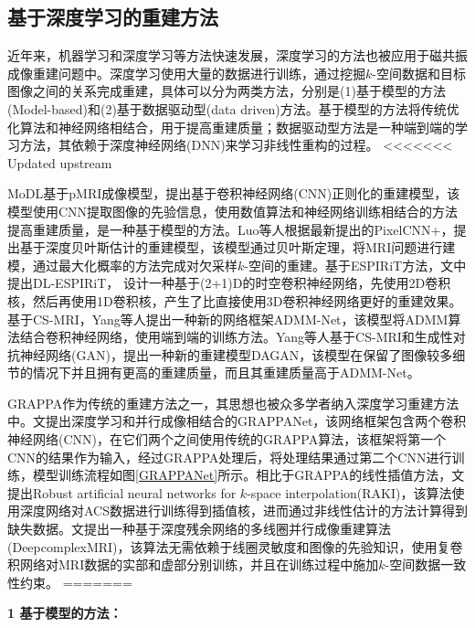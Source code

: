 \documentclass[UTF8]{article}
\begin{document}
\subsection{基于深度学习的重建方法}
\par 近年来，机器学习和深度学习等方法快速发展，深度学习的方法也被应用于磁共振成像重建问题中。深度学习使用大量的数据进行训练，通过挖掘$k$-空间数据和目标图像之间的关系完成重建，具体可以分为两类方法，分别是(1)基于模型的方法(Model-based)和(2)基于数据驱动型(data driven)方法。基于模型的方法将传统优化算法和神经网络相结合，用于提高重建质量；数据驱动型方法是一种端到端的学习方法，其依赖于深度神经网络(DNN)来学习非线性重构的过程。
<<<<<<< Updated upstream

\par MoDL\cite{aggarwal2018modl}基于pMRI成像模型，提出基于卷积神经网络(CNN)正则化的重建模型，该模型使用CNN提取图像的先验信息，使用数值算法和神经网络训练相结合的方法提高重建质量，是一种基于模型的方法。Luo等人根据最新提出的PixelCNN+\cite{salimans2017pixelcnn++}，提出基于深度贝叶斯估计的重建模型\cite{luo2020mri}，该模型通过贝叶斯定理，将MRI问题进行建模，通过最大化概率的方法完成对欠采样$k$-空间的重建。基于ESPIRiT方法，文\cite{sandino2021accelerating}中提出DL-ESPIRiT， 设计一种基于(2+1)D的时空卷积神经网络，先使用2D卷积核，然后再使用1D卷积核，产生了比直接使用3D卷积神经网络更好的重建效果。基于CS-MRI，Yang等人提出一种新的网络框架ADMM-Net\cite{yang2016deep}，该模型将ADMM算法结合卷积神经网络，使用端到端的训练方法。Yang等人基于CS-MRI和生成性对抗神经网络(GAN)，提出一种新的重建模型DAGAN\cite{yang2017dagan}，该模型在保留了图像较多细节的情况下并且拥有更高的重建质量，而且其重建质量高于ADMM-Net。
\par GRAPPA作为传统的重建方法之一，其思想也被众多学者纳入深度学习重建方法中。文\cite{9157643}提出深度学习和并行成像相结合的GRAPPANet，该网络框架包含两个卷积神经网络(CNN)，在它们两个之间使用传统的GRAPPA算法，该框架将第一个CNN的结果作为输入，经过GRAPPA处理后，将处理结果通过第二个CNN进行训练，模型训练流程如图\ref{GRAPPANet}所示。相比于GRAPPA的线性插值方法，文\cite{Mehmet2019Scan}提出Robust artificial neural networks for $k$-space interpolation(RAKI)，该算法使用深度网络对ACS数据进行训练得到插值核，进而通过非线性估计的方法计算得到缺失数据。文\cite{WANG2020136}提出一种基于深度残余网络的多线圈并行成像重建算法(DeepcomplexMRI)，该算法无需依赖于线圈灵敏度和图像的先验知识，使用复卷积网络对MRI数据的实部和虚部分别训练，并且在训练过程中施加$k$-空间数据一致性约束。
=======
\par \textbf{1 基于模型的方法：}
\end{document}
